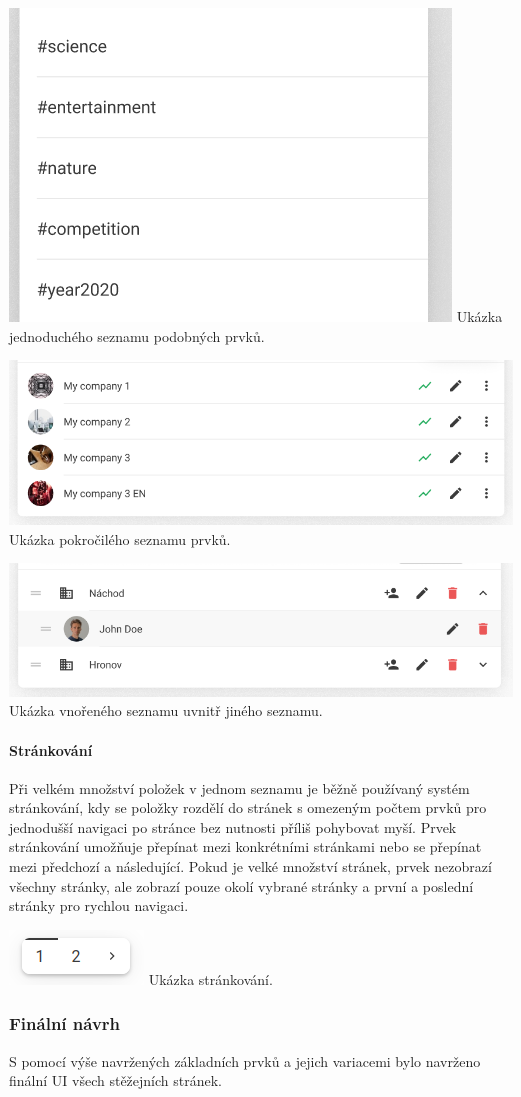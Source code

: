 			\includegraphics[width=0.24\linewidth]{obrazky/jednoduchy_seznam}\hfill
			Ukázka jednoduchého seznamu podobných prvků. %

			\includegraphics[width=0.24\linewidth]{obrazky/seznam}\hfill
			Ukázka pokročilého seznamu prvků. %

			\includegraphics[width=0.24\linewidth]{obrazky/vnoreny_seznam}\hfill
			Ukázka vnořeného seznamu uvnitř jiného seznamu. %

			\paragraph{Stránkování}

			Při velkém množství položek v jednom seznamu je běžně používaný systém stránkování, kdy se položky rozdělí
			do stránek s omezeným počtem prvků pro jednodušší navigaci po stránce bez nutnosti příliš pohybovat myší.
			Prvek stránkování umožňuje přepínat mezi konkrétními stránkami nebo se přepínat mezi předchozí a následující.
			Pokud je velké množství stránek, prvek nezobrazí všechny stránky, ale zobrazí pouze okolí vybrané stránky
			a první a poslední stránky pro rychlou navigaci.

			\includegraphics[width=0.24\linewidth]{obrazky/strankovani}\hfill
			Ukázka stránkování. %

		\subsubsection{Finální návrh}

		S pomocí výše navržených základních prvků a jejich variacemi bylo navrženo finální \ac{UI} všech stěžejních
		stránek.

